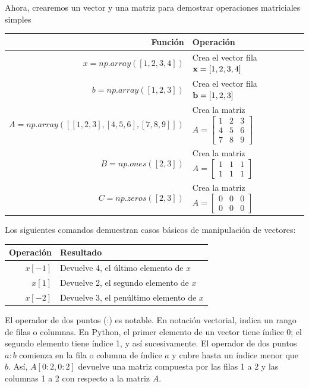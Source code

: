 Ahora, crearemos un vector y una matriz para demostrar operaciones matriciales simples \vs

\begin{tabular}{r|l}
Función 			& Operación \\
\hline
$x = np.array([1,2,3,4])$ 					&   Crea el vector fila $\textbf{x} = [1,2,3,4]$\\
$b = np.array([1,2,3])$ 					&   Crea el vector fila $\textbf{b} = [1,2,3]$\\
$A = np.array([[1,2,3], [4,5,6], [7,8,9]])$  &   Crea la matriz $ A = \begin{bmatrix} 1 & 2 & 3\\ 4 & 5 & 6 \\ 7 & 8 & 9 \end{bmatrix} $\\
$B = np.ones([2,3])$   &   Crea la matriz $ A = \begin{bmatrix} 1 & 1 & 1\\ 1 & 1 & 1 \end{bmatrix} $\\
$C = np.zeros([2,3])$   &   Crea la matriz $ A = \begin{bmatrix} 0 & 0 & 0\\ 0 & 0 & 0 \end{bmatrix} $\\
\hline
\end{tabular}

\vs
Los siguientes comandos demuestran casos básicos de manipulación de vectores:
\vs

\begin{tabular}{r|l}
Operación 			& Resultado \\
\hline
$x[-1]$ 				&   Devuelve 4, el último elemento de $x$\\
$x[1]$ 					&   Devuelve 2, el segundo elemento de $x$\\
$x[-2]$ 				&  Devuelve 3, el penúltimo elemento de $x$\\
\hline
\end{tabular}

\vs
El operador de dos puntos (:) es notable. En notación vectorial, indica un rango de filas o columnas. En Python, el primer elemento de un vector tiene índice 0; el segundo elemento tiene índice 1, y así sucesivamente. El operador de dos puntos $a:b$ comienza en la fila o columna de índice $a$ y cubre hasta un índice menor que $b$. Así, $A[0:2,0:2]$ devuelve una matriz compuesta por las filas 1 a 2 y las columnas 1 a 2 con respecto a la matriz $A$.

